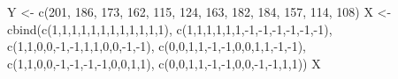 \documentclass[
]{book}
\newenvironment{Shaded}{\begin{snugshade}}{\end{snugshade}}
\newcommand{\DecValTok}[1]{\textcolor[rgb]{0.00,0.00,0.81}{#1}}
\newcommand{\FunctionTok}[1]{\textcolor[rgb]{0.00,0.00,0.00}{#1}}
\newcommand{\NormalTok}[1]{#1}
\newcommand{\OtherTok}[1]{\textcolor[rgb]{0.56,0.35,0.01}{#1}}
\newcommand{\SpecialCharTok}[1]{\textcolor[rgb]{0.00,0.00,0.00}{#1}}
\begin{document}
\begin{Shaded}
\begin{Highlighting}[]
\NormalTok{Y }\OtherTok{\textless{}{-}} \FunctionTok{c}\NormalTok{(}\DecValTok{201}\NormalTok{, }\DecValTok{186}\NormalTok{, }\DecValTok{173}\NormalTok{, }\DecValTok{162}\NormalTok{, }\DecValTok{115}\NormalTok{, }\DecValTok{124}\NormalTok{, }\DecValTok{163}\NormalTok{, }\DecValTok{182}\NormalTok{, }\DecValTok{184}\NormalTok{, }\DecValTok{157}\NormalTok{, }\DecValTok{114}\NormalTok{, }\DecValTok{108}\NormalTok{)}
\NormalTok{X }\OtherTok{\textless{}{-}} \FunctionTok{cbind}\NormalTok{(}\FunctionTok{c}\NormalTok{(}\DecValTok{1}\NormalTok{,}\DecValTok{1}\NormalTok{,}\DecValTok{1}\NormalTok{,}\DecValTok{1}\NormalTok{,}\DecValTok{1}\NormalTok{,}\DecValTok{1}\NormalTok{,}\DecValTok{1}\NormalTok{,}\DecValTok{1}\NormalTok{,}\DecValTok{1}\NormalTok{,}\DecValTok{1}\NormalTok{,}\DecValTok{1}\NormalTok{,}\DecValTok{1}\NormalTok{),}
           \FunctionTok{c}\NormalTok{(}\DecValTok{1}\NormalTok{,}\DecValTok{1}\NormalTok{,}\DecValTok{1}\NormalTok{,}\DecValTok{1}\NormalTok{,}\DecValTok{1}\NormalTok{,}\DecValTok{1}\NormalTok{,}\SpecialCharTok{{-}}\DecValTok{1}\NormalTok{,}\SpecialCharTok{{-}}\DecValTok{1}\NormalTok{,}\SpecialCharTok{{-}}\DecValTok{1}\NormalTok{,}\SpecialCharTok{{-}}\DecValTok{1}\NormalTok{,}\SpecialCharTok{{-}}\DecValTok{1}\NormalTok{,}\SpecialCharTok{{-}}\DecValTok{1}\NormalTok{),}
           \FunctionTok{c}\NormalTok{(}\DecValTok{1}\NormalTok{,}\DecValTok{1}\NormalTok{,}\DecValTok{0}\NormalTok{,}\DecValTok{0}\NormalTok{,}\SpecialCharTok{{-}}\DecValTok{1}\NormalTok{,}\SpecialCharTok{{-}}\DecValTok{1}\NormalTok{,}\DecValTok{1}\NormalTok{,}\DecValTok{1}\NormalTok{,}\DecValTok{0}\NormalTok{,}\DecValTok{0}\NormalTok{,}\SpecialCharTok{{-}}\DecValTok{1}\NormalTok{,}\SpecialCharTok{{-}}\DecValTok{1}\NormalTok{),}
           \FunctionTok{c}\NormalTok{(}\DecValTok{0}\NormalTok{,}\DecValTok{0}\NormalTok{,}\DecValTok{1}\NormalTok{,}\DecValTok{1}\NormalTok{,}\SpecialCharTok{{-}}\DecValTok{1}\NormalTok{,}\SpecialCharTok{{-}}\DecValTok{1}\NormalTok{,}\DecValTok{0}\NormalTok{,}\DecValTok{0}\NormalTok{,}\DecValTok{1}\NormalTok{,}\DecValTok{1}\NormalTok{,}\SpecialCharTok{{-}}\DecValTok{1}\NormalTok{,}\SpecialCharTok{{-}}\DecValTok{1}\NormalTok{),}
           \FunctionTok{c}\NormalTok{(}\DecValTok{1}\NormalTok{,}\DecValTok{1}\NormalTok{,}\DecValTok{0}\NormalTok{,}\DecValTok{0}\NormalTok{,}\SpecialCharTok{{-}}\DecValTok{1}\NormalTok{,}\SpecialCharTok{{-}}\DecValTok{1}\NormalTok{,}\SpecialCharTok{{-}}\DecValTok{1}\NormalTok{,}\SpecialCharTok{{-}}\DecValTok{1}\NormalTok{,}\DecValTok{0}\NormalTok{,}\DecValTok{0}\NormalTok{,}\DecValTok{1}\NormalTok{,}\DecValTok{1}\NormalTok{),}
           \FunctionTok{c}\NormalTok{(}\DecValTok{0}\NormalTok{,}\DecValTok{0}\NormalTok{,}\DecValTok{1}\NormalTok{,}\DecValTok{1}\NormalTok{,}\SpecialCharTok{{-}}\DecValTok{1}\NormalTok{,}\SpecialCharTok{{-}}\DecValTok{1}\NormalTok{,}\DecValTok{0}\NormalTok{,}\DecValTok{0}\NormalTok{,}\SpecialCharTok{{-}}\DecValTok{1}\NormalTok{,}\SpecialCharTok{{-}}\DecValTok{1}\NormalTok{,}\DecValTok{1}\NormalTok{,}\DecValTok{1}\NormalTok{))}
\NormalTok{X}
\end{Highlighting}
\end{Shaded}
\end{document}
